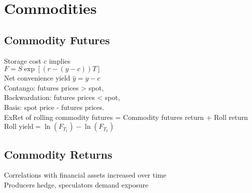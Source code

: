 \section{Commodities}
	\subsection*{Commodity Futures}
	Storage cost $c$ implies\\
	$F = S\exp\left[\left(r - \left(y - c\right)\right)T\right]$\\
	Net convenience yield $\hat{y} = y - c$\\
	Contango: futures prices > spot,\\
	Backwardation: futures prices < spot,\\
	Basis: spot price - futures prices.\\
	ExRet of rolling commodity futures = Commodity futures return + Roll return\\
	$\text{Roll yield} = \ln\left(F_{T_{1}}\right) - \ln\left(F_{T_{2}}\right)$
	
	\subsection*{Commodity Returns}
	Correlations with financial assets increased over time\\
	Producers hedge, speculators demand exposure

